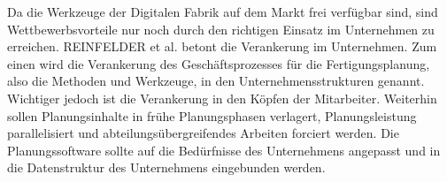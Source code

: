 Da die Werkzeuge der Digitalen Fabrik auf dem Markt frei verfügbar sind, sind Wettbewerbsvorteile nur noch durch den richtigen Einsatz im Unternehmen zu erreichen. 
REINFELDER et al. betont die Verankerung im Unternehmen. Zum einen wird die Verankerung des Geschäftsprozesses für die Fertigungsplanung, also die Methoden und Werkzeuge, in den Unternehmensstrukturen genannt. Wichtiger jedoch ist die Verankerung in den Köpfen der Mitarbeiter. 
Weiterhin sollen Planungsinhalte in frühe Planungsphasen verlagert, Planungsleistung parallelisiert und abteilungsübergreifendes Arbeiten forciert werden. Die Planungssoftware sollte auf die Bedürfnisse des Unternehmens angepasst und in die Datenstruktur des Unternehmens eingebunden werden. 

% 
